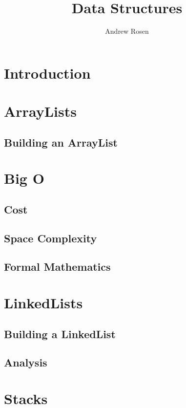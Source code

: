 \documentclass[10pt,a4paper]{book}
\begin{document}
\title{Data Structures}
\author{Andrew Rosen}
\date{}
\maketitle
\tableofcontents




\chapter{Introduction}
\chapter{ArrayLists}

\section{Building an ArrayList}
\chapter{Big O}

\section{Cost}

\section{Space Complexity}

\section{Formal Mathematics}

\chapter{LinkedLists}
\section{Building a LinkedList}

\section{Analysis}
\chapter{Stacks}
\end{document}
